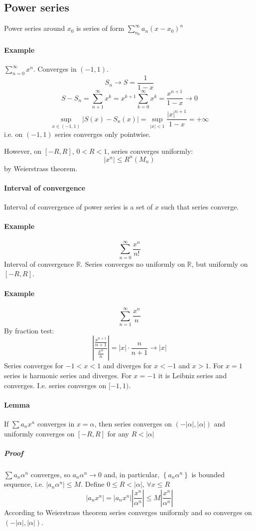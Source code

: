 \subsection{Power series}
Power series around $x_0$ is series of form $\sum_{n_0}^\infty a_n(x-x_0)^n$
\paragraph{Example}
$\sum_{n=0}^\infty x^n$.
Converges in $(-1, 1)$.
$$S_n \to S = \frac{1}{1-x}$$
$$S-S_n = \sum_{n+1}^\infty x^k = x^{k+1} \sum_{k=0}^\infty x^k = \frac{x^{n+1}}{1-x} \to 0 $$
$$\sup_{x\in (-1,1)} \left| S(x) - S_n(x) \right| = \sup_{|x|<1} \frac{|x|^{n+1}}{1-x} = +\infty$$
i.e. on $(-1,1)$ series converges only pointwise.

However, on $[-R,R]$, $0<R<1$, series converges uniformly:
$$|x^n| \leq R^n \left(M_n\right)$$
by Weierstrass theorem.
\paragraph{Interval of convergence}
Interval of convergence of power series is a set of $x$ such that series converge.
\paragraph{Example}
$$\sum_{n=0}^\infty \frac{x^n}{n!}$$
Interval of convergence $\mathbb{R}$. Series converges no uniformly on $\mathbb{R}$, but uniformly on $[-R,R]$.
\paragraph{Example}
$$\sum_{n=1}^\infty \frac{x^n}{n}$$
By fraction test:
$$\left|\frac{\frac{x^{n+1}}{n+1}}{\frac{x^{n}}{n}}\right| = \left|x\right| \cdot \frac{n}{n+1} \to |x|$$
Series converges for $-1<x<1$ and diverges for $x<-1$ and $x>1$. For $x=1$ series is harmonic series and diverges. For $x=-1$ it is Leibniz series and converges. I.e. series converges on $[-1,1)$.
\paragraph{Lemma}
If $\sum a_n x^n$ converges in $x=\alpha$, then series converges on $(-|\alpha|, |\alpha|)$ and uniformly converges on $[-R,R]$ for any $R<|\alpha|$
\subparagraph{Proof}
$\sum a_n \alpha^n$  converges, so $a_n \alpha^n \to 0$ and, in particular, $\left\{a_n \alpha^n\right\}$ is bounded sequence, i.e. $\left|a_n\alpha^n\right| \leq M$.
Define $0 \leq R < |\alpha|$, $\forall x \leq R$
$$\left|a_n x^n \right| = \left|a_n x^n \right| \left|\frac{x^n}{\alpha^n}\right| \leq M  \left|\frac{x^n}{\alpha^n}\right| $$
According to Weierstrass theorem series converges uniformly and so converges on $(-|\alpha|, |\alpha|)$.
